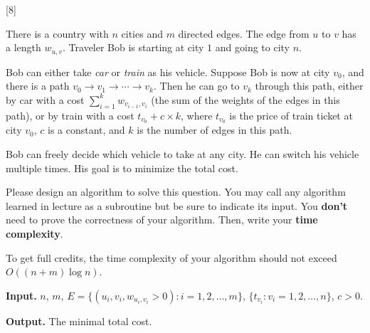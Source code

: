[8]

There is a country with $n$ cities and $m$ directed edges. The edge from $u$ to $v$ has a length $w_{u,v}$.
Traveler Bob is starting at city $1$ and going to city $n$. 

Bob can either take \emph{car} or \emph{train} as his vehicle. 
Suppose Bob is now at city $v_0$, and there is a path $v_0\rightarrow v_1\rightarrow \cdots \rightarrow v_k$.
Then he can go to $v_k$ through this path, either by car with a cost $\sum_{i=1}^k w_{v_{i-1}, v_i}$ (the sum of the weights of the edges in this path), or by train with a cost $t_{v_0} + c\times k$, where $t_{v_0}$ is the price of train ticket at city $v_0$, $c$ is a constant, and $k$ is the number of edges in this path. 

Bob can freely decide which vehicle to take at any city. He can switch his vehicle multiple times. His goal is to minimize the total cost. 

Please design an algorithm to solve this question. You may call any algorithm learned in lecture as a subroutine but be sure to indicate its input. You \textbf{don't} need to prove the correctness of your algorithm. Then, write your \textbf{time complexity}.

To get full credits, the time complexity of your algorithm should not exceed $O\left(\left(n + m\right) \log n\right)$.

\textbf{Input. } $n$, $m$, $E=\{(u_i,v_i,w_{u_i,v_i}>0):i=1,2,\ldots, m\}$, $\{t_{v_i}: v_i=1,2,\ldots, n\}$, $c>0$.

\textbf{Output. } The minimal total cost.

\begin{solution}

    \vspace{12cm}
    
\end{solution}





